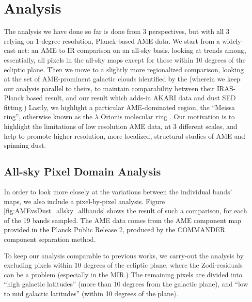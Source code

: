 \documentclass[preprint2,longabstract]{aastex}
\begin{document}
\section{Analysis}
\label{sec:analysis}

The analysis we have done so far is done from 3 perspectives, but with all 3 relying on 1-degree resolution, Planck-based AME data. We start from a widely-cast net: an AME to IR comparison on an all-sky basis, looking at trends among, essentially, all pixels in the all-sky maps except for those within 10 degrees of the ecliptic plane. Then we move to a slightly more regionalized comparison, looking at the set of AME-prominent galactic clouds identified by the \cite{planckXV} (wherein we keep our analysis parallel to theirs, to maintain comparability between their IRAS-Planck based result, and our result which adds-in AKARI data and dust SED fitting.) Lastly, we highlight a particular AME-dominated region, the ``Meissa ring'', otherwise known as the $\lambda$ Orionis molecular ring \citep{maddalena86,maddalena87}. Our motivation is to highlight the limitations of low resolution AME data, at 3 different scales, and help to promote higher resolution, more localized, structural studies of AME and spinning dust.

\subsection{All-sky Pixel Domain Analysis}

	In order to look more closely at the variations between the individual bands' maps, we also include a pixel-by-pixel analysis. Figure \ref{fig:AMEvsDust_allsky_allbands} shows the result of such a comparison, for each of the 19 bands sampled. The AME data comes from the AME component map provided in the Planck Public Release 2, produced by the COMMANDER component separation method.

    To keep our analysis comparable to previous works, we carry-out the analysis by excluding pixels within 10 degrees of the ecliptic plane, where the Zodi-residuals can be a problem (especially in the MIR.) The remaining pixels are divided into ``high galactic latitudes'' (more than 10 degrees from the galactic plane), and ``low to mid galactic latitudes'' (within 10 degrees of the plane).
\end{document}
